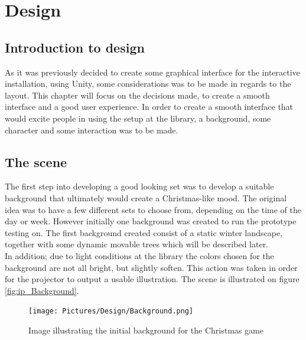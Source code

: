 \chapter{Design}
\section{Introduction to design}
As it was previously decided to create some graphical interface for the interactive installation, using Unity, some considerations was to be made in regards to the layout. This chapter will focus on the decisions made, to create a smooth interface and a good user experience. In order to create a smooth interface that would excite people in using the setup at the library, a background, some character and some interaction was to be made.

\section{The scene}
The first step into developing a good looking set was to develop a suitable background that ultimately would create a Christmas-like mood. The original idea was to have a few different sets to choose from, depending on the time of the day or week. However initially one background was created to run the prototype testing on. The first background created consist of a static winter landscape, together with some dynamic movable trees which will be described later.\\
In addition; due to light conditions at the library the colors chosen for the background are not all bright, but slightly soften. This action was taken in order for the projector to output a usable illustration. The scene is illustrated on  figure \eqref{fig:ip_Background}.

\begin{figure}[htbp]
\centering
\texttt{[image: Pictures/Design/Background.png]}
\caption{Image illustrating the initial background for the Christmas game}
\label{fig:ip_Background}
\end{figure}


